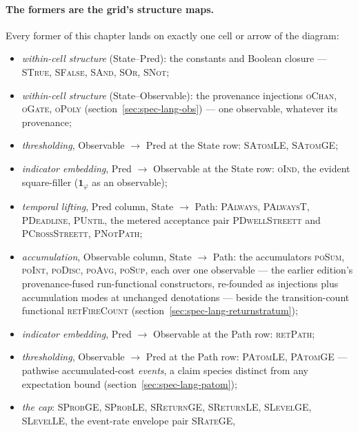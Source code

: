 \paragraph{The formers are the grid's structure maps.} Every former
of this chapter lands on exactly one cell or arrow of the diagram:

\begin{itemize}
\item \emph{within-cell structure} (State--Pred): the constants and
  Boolean closure --- \textsc{STrue}, \textsc{SFalse}, \textsc{SAnd},
  \textsc{SOr}, \textsc{SNot};
\item \emph{within-cell structure} (State--Observable): the
  provenance injections \textsc{oChan}, \textsc{oGate},
  \textsc{oPoly} (section~\ref{sec:spec-lang-obs}) --- one
  observable, whatever its provenance;
\item \emph{thresholding}, Observable $\to$ Pred at the State row:
  \textsc{SAtomLE}, \textsc{SAtomGE};
\item \emph{indicator embedding}, Pred $\to$ Observable at the State
  row: \textsc{oInd}, the evident square-filler
  ($\mathbf{1}_\varphi$ as an observable);
\item \emph{temporal lifting}, Pred column, State $\to$ Path:
  \textsc{PAlways}, \textsc{PAlwaysT}, \textsc{PDeadline},
  \textsc{PUntil}, the metered acceptance pair
  \textsc{PDwellStreett} and \textsc{PCrossStreett},
  \textsc{PNotPath};
\item \emph{accumulation}, Observable column, State $\to$ Path: the
  accumulators \textsc{poSum}, \textsc{poInt}, \textsc{poDisc},
  \textsc{poAvg}, \textsc{poSup}, each over one observable --- the
  earlier edition's provenance-fused run-functional constructors,
  re-founded as injections plus accumulation modes at unchanged
  denotations --- beside the transition-count functional
  \textsc{retFireCount} (section~\ref{sec:spec-lang-returnstratum});
\item \emph{indicator embedding}, Pred $\to$ Observable at the Path
  row: \textsc{retPath};
\item \emph{thresholding}, Observable $\to$ Pred at the Path row:
  \textsc{PAtomLE}, \textsc{PAtomGE} --- pathwise accumulated-cost
  \emph{events}, a claim species distinct from any expectation bound
  (section~\ref{sec:spec-lang-patom});
\item \emph{the cap}: \textsc{SProbGE}, \textsc{SProbLE},
  \textsc{SReturnGE}, \textsc{SReturnLE}, \textsc{SLevelGE},
  \textsc{SLevelLE}, the event-rate envelope pair \textsc{SRateGE},

\end{itemize}
